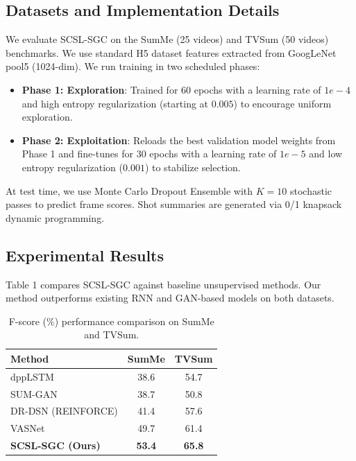 \documentclass[letterpaper]{article} %
\begin{document}
\subsection{Datasets and Implementation Details}
We evaluate SCSL-SGC on the SumMe \cite{gygli2014creating} (25 videos) and TVSum \cite{song2015tvsum} (50 videos) benchmarks. We use standard H5 dataset features extracted from GoogLeNet pool5 (1024-dim). We run training in two scheduled phases:
\begin{itemize}
    \item \textbf{Phase 1: Exploration}: Trained for 60 epochs with a learning rate of $1e-4$ and high entropy regularization (starting at $0.005$) to encourage uniform exploration.
    \item \textbf{Phase 2: Exploitation}: Reloads the best validation model weights from Phase 1 and fine-tunes for 30 epochs with a learning rate of $1e-5$ and low entropy regularization ($0.001$) to stabilize selection.
\end{itemize}
At test time, we use Monte Carlo Dropout Ensemble with $K=10$ stochastic passes to predict frame scores. Shot summaries are generated via 0/1 knapsack dynamic programming.

\subsection{Experimental Results}
Table 1 compares SCSL-SGC against baseline unsupervised methods. Our method outperforms existing RNN and GAN-based models on both datasets.

\begin{table}[h]
\centering
\caption{F-score (\%) performance comparison on SumMe and TVSum.}
\begin{tabular}{lcc}
\toprule
\textbf{Method} & \textbf{SumMe} & \textbf{TVSum} \\
\midrule
dppLSTM \cite{zhang2016video} & 38.6 & 54.7 \\
SUM-GAN \cite{mahasseni2017unsupervised} & 38.7 & 50.8 \\
DR-DSN (REINFORCE) \cite{zhou2018deep} & 41.4 & 57.6 \\
VASNet \cite{fajtl2018summarizing} & 49.7 & 61.4 \\
\midrule
\textbf{SCSL-SGC (Ours)} & \textbf{53.4} & \textbf{65.8} \\
\bottomrule
\end{tabular}
\end{table}
\end{document}
